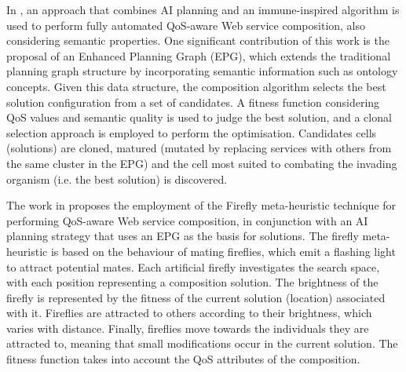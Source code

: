 In \cite{pop2010immune}, an approach that combines AI planning and an immune-inspired algorithm is used to perform fully automated QoS-aware Web service composition, also considering
semantic properties. One significant contribution of this work is the proposal of an Enhanced Planning Graph (EPG), which extends the traditional planning graph structure
by incorporating semantic information such as ontology concepts. Given this data structure, the composition algorithm selects the best solution configuration from a set of candidates. A fitness function considering QoS values and semantic quality is used to judge the best solution, and a clonal selection approach is employed to perform the optimisation. Candidates cells (solutions) are cloned, matured (mutated by replacing services with others from the same cluster in the EPG) and the cell most suited to combating the invading organism (i.e. the best solution) is discovered.

The work in \cite{pop2011hybrid} proposes the employment of the Firefly meta-heuristic technique for performing QoS-aware Web service composition, in conjunction with an AI planning strategy that uses an EPG as the basis for solutions. The firefly meta-heuristic is based on the behaviour of mating fireflies, which emit a flashing light to attract potential mates. Each artificial firefly investigates the search space, with each position representing a composition solution. The brightness of the firefly is represented by the fitness of the current solution (location) associated with it. Fireflies are attracted to others according to their brightness, which varies with distance. Finally, fireflies move towards the individuals they are attracted to, meaning that small modifications occur in the current solution. The fitness function takes into account the QoS attributes of the composition.

